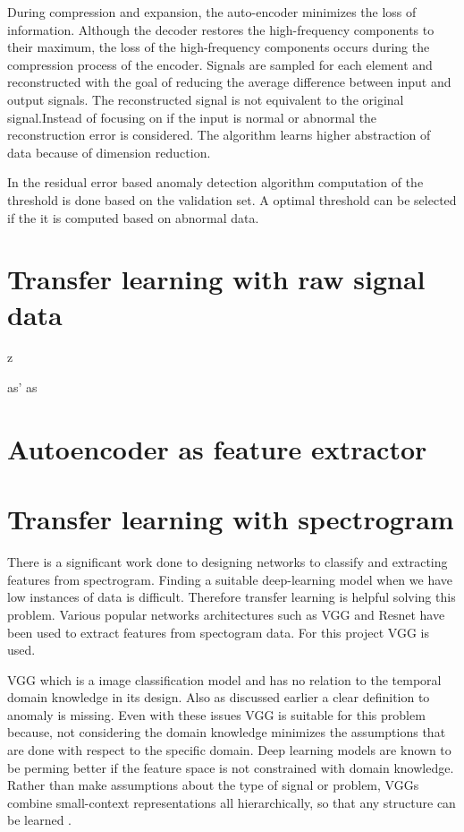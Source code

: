     
    During compression and expansion, the auto-encoder minimizes the loss of information. Although the decoder restores the high-frequency components to their maximum, the loss of the high-frequency components occurs during the compression process of the encoder. Signals are sampled for each element and reconstructed with the goal of reducing the average difference between input and output signals. The reconstructed signal is not equivalent to the original signal.Instead of focusing on if the input is normal or abnormal the reconstruction error is considered. The algorithm learns higher abstraction of data because of dimension reduction.
    
    In the residual error based anomaly detection algorithm computation of the threshold is done based on the validation set. A optimal threshold can be selected if the it is computed based on abnormal data.
    
  
   \section{Transfer learning with raw signal data}
   z
   
   as'
   as

   
   
   \section{Autoencoder as feature extractor}    
   
   
   \section{Transfer learning with spectrogram}   
  There is a significant work done to designing networks to classify and extracting features from spectrogram. Finding a suitable deep-learning model when we have low instances of data is difficult. Therefore transfer learning is helpful solving this problem. Various popular networks architectures such as VGG and Resnet have been used to extract features from spectogram data. For this project VGG is used. 
  
  VGG which is a image classification model and has no relation to the temporal domain knowledge in its design. Also as discussed earlier a clear definition to anomaly is missing. Even with these issues VGG is suitable for this problem because, not considering the domain knowledge minimizes the assumptions that are done with respect to the specific domain. Deep learning models are known to be perming better if the feature space is not constrained with domain knowledge. Rather than make assumptions about the type of signal or problem, VGGs combine small-context representations all hierarchically, so that any structure can be learned \cite{vgg}. 
  
